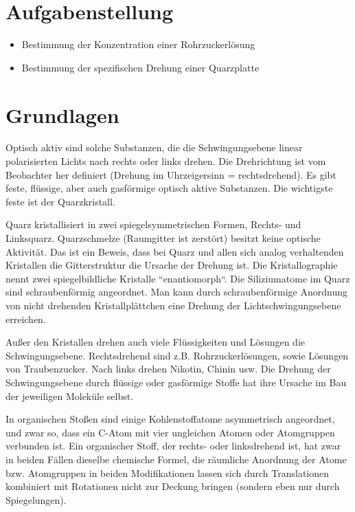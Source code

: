 \documentclass[11pt,ngerman]{scrartcl}
\begin{document}

\tableofcontents
\newpage

\section{Aufgabenstellung\label{Auf0}}

\begin{itemize}
	\item Bestimmung der Konzentration einer Rohrzuckerlösung

	\item Bestimmung der spezifischen Drehung einer Quarzplatte
\end{itemize}


\section{Grundlagen}

Optisch aktiv sind solche Substanzen, die die Schwingungsebene linear polarisierten Lichts nach
rechts oder links drehen. Die Drehrichtung ist vom Beobachter her definiert (Drehung im Uhrzeigersinn
= rechtsdrehend). Es gibt feste, flüssige, aber auch gasförmige optisch aktive Substanzen.
Die wichtigste feste ist der Quarzkristall.

Quarz kristallisiert in zwei spiegelsymmetrischen Formen, Rechts- und Linksquarz. Quarzschmelze (Raumgitter ist zerstört) besitzt keine optische
Aktivität. Das ist ein Beweis, dass bei Quarz und allen sich analog verhaltenden Kristallen
die Gitterstruktur die Ursache der Drehung ist. Die Kristallographie nennt zwei spiegelbildliche
Kristalle ``enantiomorph``. Die Siliziumatome im Quarz sind schraubenförmig angeordnet. Man
kann durch schraubenförmige Anordnung von nicht drehenden Kristallplättchen eine Drehung
der Lichtschwingungsebene erreichen.

Außer den Kristallen drehen auch viele Flüssigkeiten und Lösungen die Schwingungsebene.
Rechtsdrehend sind z.B. Rohrzuckerlösungen, sowie Lösungen von Traubenzucker. Nach links
drehen Nikotin, Chinin usw. Die Drehung der Schwingungsebene durch flüssige oder gasförmige
Stoffe hat ihre Ursache im Bau der jeweiligen Moleküle selbst.

In organischen Stoßen sind einige Kohlenstoffatome asymmetrisch angeordnet, und zwar so,
dass ein C-Atom mit vier ungleichen Atomen oder Atomgruppen verbunden ist. Ein organischer
Stoff, der rechts- oder linksdrehend ist, hat zwar in beiden Fällen dieselbe chemische Formel, die
räumliche Anordnung der Atome bzw. Atomgruppen in beiden Modifikationen lassen sich durch
Translationen kombiniert mit Rotationen nicht zur Deckung bringen (sondern eben nur durch
Spiegelungen).
\end{document}
